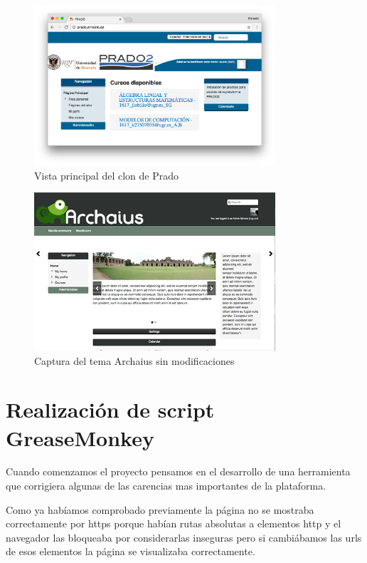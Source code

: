 \begin{figure}[H]
\centering
\includegraphics[width=0.8\textwidth]{../screenshots/pradoernesto}
\caption{Vista principal del clon de Prado}
\label{fig:pradoernesto}
\end{figure}

\begin{figure}[H]
\centering
\includegraphics[width=0.8\textwidth]{../screenshots/archaius}
\caption{Captura del tema Archaius sin modificaciones}
\label{fig:archaius}
\end{figure}




\section{Realización de script GreaseMonkey}

Cuando comenzamos el proyecto pensamos en el desarrollo de una herramienta que corrigiera algunas de las carencias mas importantes de la plataforma. 

\bigskip
Como ya habíamos comprobado previamente la página no se mostraba correctamente por https porque habían rutas absolutas a elementos http y el navegador las bloqueaba por considerarlas inseguras pero si cambiábamos las urls de esos elementos la página se visualizaba correctamente.

